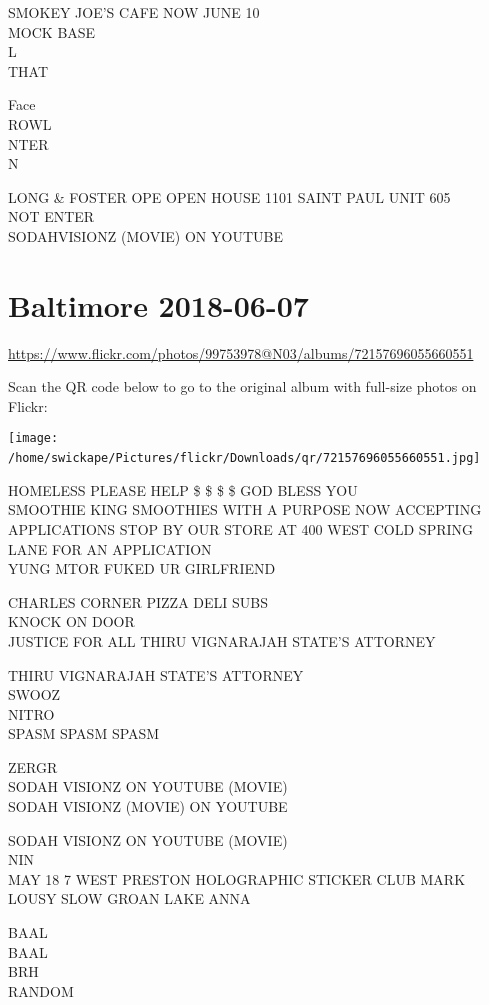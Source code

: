 \documentclass[10pt,letterpaper]{article}
\begin{document}
SMOKEY JOE'S CAFE NOW JUNE 10\\
MOCK BASE\\
L\\
THAT

Face\\
ROWL\\
NTER\\
N

LONG \& FOSTER OPE OPEN HOUSE 1101 SAINT PAUL UNIT 605\\
NOT ENTER\\
SODAHVISIONZ (MOVIE) ON YOUTUBE
\

\section*{Baltimore 2018-06-07}

\url{https://www.flickr.com/photos/99753978@N03/albums/72157696055660551}

Scan the QR code below to go to the original album with full-size photos on Flickr:

\texttt{[image: /home/swickape/Pictures/flickr/Downloads/qr/72157696055660551.jpg]}
\

HOMELESS PLEASE HELP \$ \$ \$ \$ GOD BLESS YOU\\
SMOOTHIE KING SMOOTHIES WITH A PURPOSE NOW ACCEPTING APPLICATIONS STOP BY OUR STORE AT 400 WEST COLD SPRING LANE FOR AN APPLICATION\\
YUNG MTOR FUKED UR GIRLFRIEND

CHARLES CORNER PIZZA DELI SUBS\\
KNOCK ON DOOR\\
JUSTICE FOR ALL THIRU VIGNARAJAH STATE'S ATTORNEY

THIRU VIGNARAJAH STATE'S ATTORNEY\\
SWOOZ\\
NITRO\\
SPASM SPASM SPASM

ZERGR\\
SODAH VISIONZ ON YOUTUBE (MOVIE)\\
SODAH VISIONZ (MOVIE) ON YOUTUBE

SODAH VISIONZ ON YOUTUBE (MOVIE)\\
NIN\\
MAY 18 7 WEST PRESTON HOLOGRAPHIC STICKER CLUB MARK LOUSY SLOW GROAN LAKE ANNA

BAAL\\
BAAL\\
BRH\\
RANDOM
\end{document}
